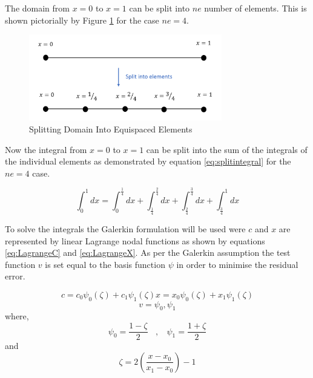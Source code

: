 \documentclass[11pt]{article}
\begin{document}
The domain from $x = 0$ to $ x = 1$ can be split into $ne$ number of elements. This is shown pictorially by Figure \ref{fig:domain2elements} for the case $ne = 4$.

\begin{figure}[h!]
\centering
\includegraphics[width=0.75\textwidth]{SplitIntoElements.PNG}
\caption{Splitting Domain Into Equispaced Elements}\label{fig:domain2elements}
\end{figure}

Now the integral from $x = 0$ to $x = 1$ can be split into the sum of the integrals of the individual elements as demonstrated by equation \ref{eq:splitintegral} for the $ne = 4$ case.


\begin{equation}
\label{eq:splitintegral}
\int_0^1 dx = \int_0^\frac{1}{4}  dx + \int_\frac{1}{4}^\frac{2}{4}  dx + \int_\frac{2}{4}^\frac{3}{4}  dx + \int_\frac{3}{4}^1  dx
\end{equation}

To solve the integrals the Galerkin formulation will be used were $c$ and $x$ are represented by linear Lagrange nodal functions as shown by equations \ref{eq:LagrangeC} and \ref{eq:LagrangeX}. As per the Galerkin assumption the test function $v$ is set equal to the basis function $\psi$ in order to minimise the residual error.




\begin{subequations}
\begin{equation}
\label{eq:LagrangeC}
c = c_{0}\psi_{0}(\zeta) + c_1\psi_{1}(\zeta) 
\end{equation}
\begin{equation}
\label{eq:LagrangeX}
x = x_{0}\psi_{0}(\zeta) + x_1\psi_{1}(\zeta)  
\end{equation}
\end{subequations}
\begin{equation}
\label{eq:LagrangeV}
v  = \psi_{0} , \psi_{1} 
\end{equation} 
where,
\begin{equation}
\label{eq:LagrangePSI}
\psi_{0} = \frac{1 - \zeta}{2} \ \ \ \ ,  \ \ \ \ \psi_{1} = \frac{1 + \zeta}{2} 
\end{equation}
and
\begin{equation}
\label{eq:LagrangeZeta}
\zeta   = 2 \left(\frac{x - x_0}{x_1 - x_0}\right) - 1 
\end{equation}
\end{document}
